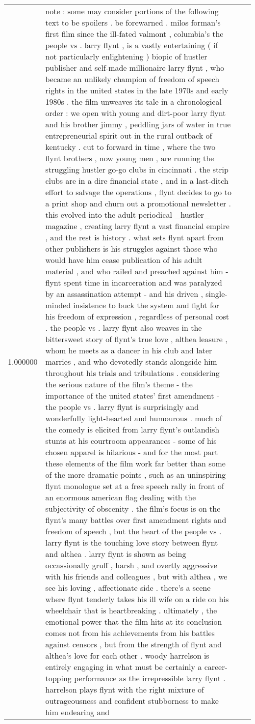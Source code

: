 \begin{tabular}{r{1cm} p{0.4in} r{1cm} p{0.4in}}
1.000000 & note : some may consider portions of the following text to be spoilers .  be forewarned .  milos forman's first film since the ill-fated valmont , columbia's the people vs .  larry flynt , is a vastly entertaining ( if not particularly enlightening ) biopic of hustler publisher and self-made millionaire larry flynt , who became an unlikely champion of freedom of speech rights in the united states in the late 1970s and early 1980s .  the film unweaves its tale in a chronological order : we open with young and dirt-poor larry flynt and his brother jimmy , peddling jars of water in true entrepreneurial spirit out in the rural outback of kentucky .  cut to forward in time , where the two flynt brothers , now young men , are running the struggling hustler go-go clubs in cincinnati .  the strip clubs are in a dire financial state , and in a last-ditch effort to salvage the operations , flynt decides to go to a print shop and churn out a promotional newsletter .  this evolved into the adult periodical _hustler_ magazine , creating larry flynt a vast financial empire , and the rest is history .  what sets flynt apart from other publishers is his struggles against those who would have him cease publication of his adult material , and who railed and preached against him - flynt spent time in incarceration and was paralyzed by an assassination attempt - and his driven , single-minded insistence to buck the system and fight for his freedom of expression , regardless of personal cost .  the people vs .  larry flynt also weaves in the bittersweet story of flynt's true love , althea leasure , whom he meets as a dancer in his club and later marries , and who devotedly stands alongside him throughout his trials and tribulations .  considering the serious nature of the film's theme - the importance of the united states' first amendment - the people vs .  larry flynt is surprisingly and wonderfully light-hearted and humourous .  much of the comedy is elicited from larry flynt's outlandish stunts at his courtroom appearances - some of his chosen apparel is hilarious - and for the most part these elements of the film work far better than some of the more dramatic points , such as an uninspiring flynt monologue set at a free speech rally in front of an enormous american flag dealing with the subjectivity of obscenity .  the film's focus is on the flynt's many battles over first amendment rights and freedom of speech , but the heart of the people vs .  larry flynt is the touching love story between flynt and althea .  larry flynt is shown as being occassionally gruff , harsh , and overtly aggressive with his friends and colleagues , but with althea , we see his loving , affectionate side .  there's a scene where flynt tenderly takes his ill wife on a ride on his wheelchair that is heartbreaking .  ultimately , the emotional power that the film hits at its conclusion comes not from his achievements from his battles against censors , but from the strength of flynt and althea's love for each other .  woody harrelson is entirely engaging in what must be certainly a career-topping performance as the irrepressible larry flynt .  harrelson plays flynt with the right mixture of outrageousness and confident stubborness to make him endearing and 
\end{tabular}
